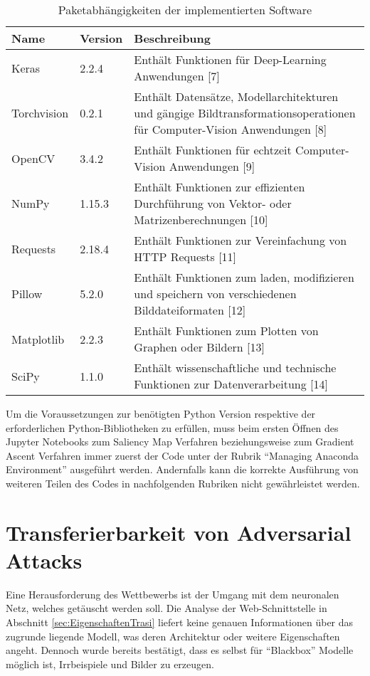 \begin{table}
	\centering
	\begin{tabular}{|l|l|p{10.4cm}|}
		\hline 
		Name & Version & Beschreibung \\ 
		\hline\hline 
		Keras& 2.2.4  & Enthält Funktionen für Deep-Learning Anwendungen [7] \\ 
		\hline 
		Torchvision& 0.2.1 & Enthält Datensätze, Modellarchitekturen und gängige Bildtransformationsoperationen für Computer-Vision Anwendungen [8] \\ 
		\hline 
		OpenCV& 3.4.2  & Enthält Funktionen für echtzeit Computer-Vision Anwendungen [9] \\ 
		\hline 
		NumPy&  1.15.3& Enthält Funktionen zur effizienten Durchführung von Vektor- oder Matrizenberechnungen [10] \\ 
		\hline 
		Requests& 2.18.4 & Enthält Funktionen zur Vereinfachung von HTTP Requests [11] \\ 
		\hline 
		Pillow& 5.2.0 & Enthält Funktionen zum laden, modifizieren und speichern von verschiedenen Bilddateiformaten [12] \\ 
		\hline 
		Matplotlib& 2.2.3 & Enthält Funktionen zum Plotten von Graphen oder Bildern [13] \\ 
		\hline 
		SciPy& 1.1.0  & Enthält wissenschaftliche und technische Funktionen zur Datenverarbeitung [14] \\ 
		\hline 
	\end{tabular} 
	\caption{Paketabhängigkeiten der implementierten Software}
	\label{tab:parameter}
\end{table}

Um die Voraussetzungen zur benötigten Python Version respektive der erforderlichen Python-Bibliotheken zu erfüllen, muss beim ersten Öffnen des Jupyter Notebooks zum Saliency Map Verfahren beziehungsweise zum Gradient Ascent Verfahren immer zuerst der Code unter der Rubrik “Managing Anaconda Environment” ausgeführt werden. Andernfalls kann die korrekte Ausführung von weiteren Teilen des Codes in nachfolgenden Rubriken nicht gewährleistet werden.

\section{Transferierbarkeit von Adversarial Attacks}


\label{sec:TrasiModell}
Eine Herausforderung des Wettbewerbs ist der Umgang mit dem neuronalen Netz, welches getäuscht werden soll. Die Analyse der Web-Schnittstelle in Abschnitt \ref{sec:EigenschaftenTrasi} liefert keine genauen Informationen über das zugrunde liegende Modell, was deren Architektur oder weitere Eigenschaften angeht. Dennoch wurde bereits bestätigt, dass es selbst für "`Blackbox"' Modelle möglich ist, Irrbeispiele und Bilder zu erzeugen.



